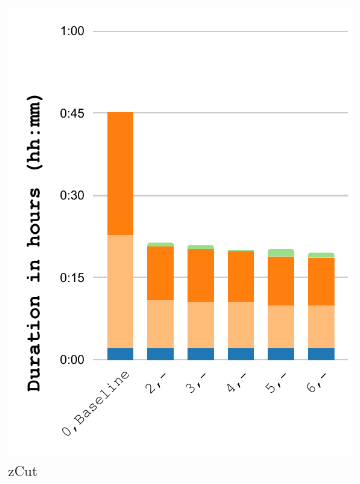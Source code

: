 \documentclass[Ingles,Final]{ic-tese-v3}
\begin{document}
\begin{figure}[]
\begin{subfigure}{0.3\textwidth}
        \includegraphics[width=\textwidth,trim={0 0 0 0},clip]{figures/prefetch_breakdown/prefetch_breakdown_zcut_salt.pdf}
        \caption{zCut}
        \label{fig:prefetch_breakdown_zcut}
    \end{subfigure}%
    \begin{subfigure}{0.3\textwidth}

\end{subfigure}
\end{figure}
\end{document}
